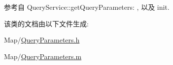 参考自 Query\-Service\-::get\-Query\-Parameters\-: , 以及 init.



该类的文档由以下文件生成\-:\begin{DoxyCompactItemize}
\item 
Map/\hyperlink{_query_parameters_8h}{Query\-Parameters.\-h}\item 
Map/\hyperlink{_query_parameters_8m}{Query\-Parameters.\-m}\end{DoxyCompactItemize}
